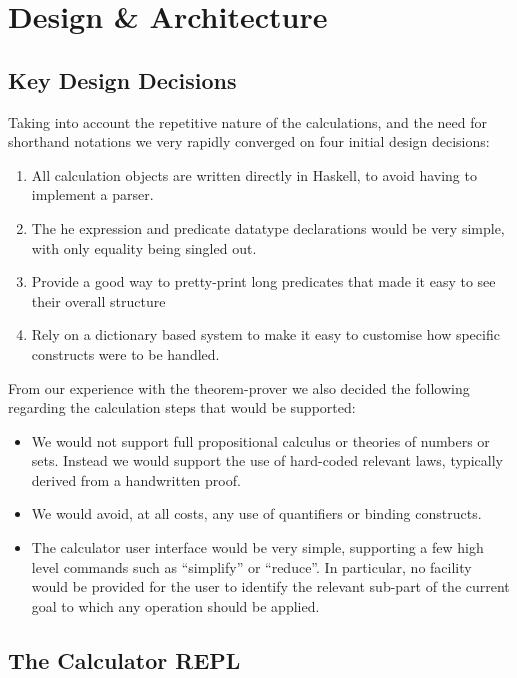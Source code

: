 \section{Design \& Architecture}\label{sec:Design}

\subsection{Key Design Decisions}

Taking into account the repetitive nature of the calculations,
and the need for shorthand notations we very rapidly converged
on four initial design decisions:
\begin{enumerate}
  \item All calculation objects are written
  directly in Haskell, to avoid having to implement a parser.
  \item The he expression and predicate datatype declarations
   would be very simple, with only equality being singled out.
  \item Provide a good way to pretty-print long predicates
    that made it easy to see their overall structure
  \item Rely on a dictionary based system to
    make it easy to customise how specific constructs
    were to be handled.
\end{enumerate}
From our experience with the  theorem-prover we also decided
the following regarding the calculation steps that would be supported:
\begin{itemize}
  \item
    We would not support full  propositional calculus
    or theories of numbers or sets.
    Instead we would support the use of hard-coded relevant laws,
    typically derived from a handwritten proof.
  \item
    We would avoid, at all costs,
    any use of quantifiers or binding constructs.
  \item
    The calculator user interface would be very simple,
    supporting a few high level commands such as ``simplify''
    or ``reduce''.
    In particular,
    no facility would be provided for the user to identify
    the relevant sub-part of the current goal to which any operation
    should be applied.
\end{itemize}

\subsection{The Calculator REPL}


